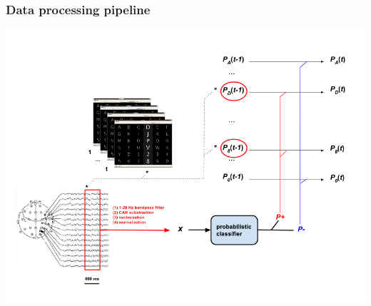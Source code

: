 \documentclass{beamer}
\begin{document}
\begin{frame}\frametitle{Data processing pipeline}
	\vspace{-1cm}
	\centerline{
		\includegraphics[width=.9\linewidth]{overview.png}
	}
\end{frame}
\end{document}
